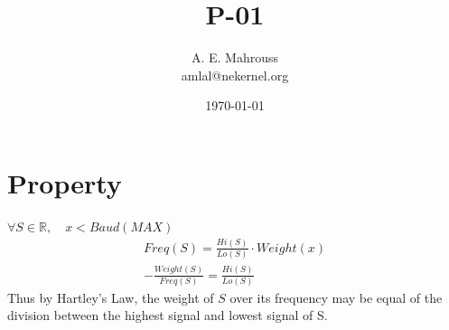 \documentclass{article}
\title{P-01}
\author{A. E. Mahrouss\\amlal@nekernel.org}
\date{\today}
\begin{document}
\maketitle

\section{Property}

$\forall S \in \mathbb{R}, \quad x < Baud(MAX)$
\begin{align*}
Freq(S) = \frac{Hi(S)}{Lo(S)} \cdot Weight(x)\\
-\frac{Weight(S)}{Freq(S)} = \frac{Hi(S)}{Lo(S)}
\end{align*}
Thus by Hartley's Law, the weight of $S$ over its frequency may be equal of the division between the highest signal and lowest signal of S.
\end{document}

